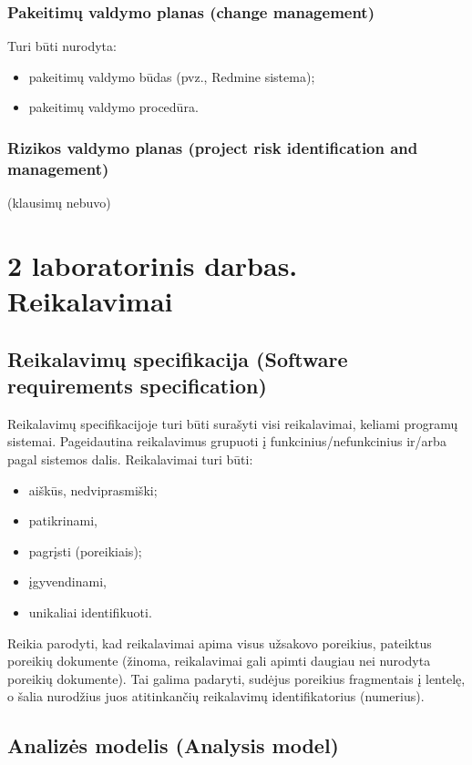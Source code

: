 \documentclass[12pt,a4paper]{article}
\begin{document}
\subsubsection*{Pakeitimų valdymo planas (change management)}

Turi būti nurodyta:
\begin{itemize}
    \item pakeitimų valdymo būdas (pvz., Redmine sistema);
    \item pakeitimų valdymo procedūra.
\end{itemize}

\subsubsection*{Rizikos valdymo planas (project risk identification and management)}

(klausimų nebuvo)

\section*{2 laboratorinis darbas. Reikalavimai}

\subsection*{Reikalavimų specifikacija (Software requirements specification)}

Reikalavimų specifikacijoje turi būti surašyti visi reikalavimai, keliami programų sistemai. Pageidautina reikalavimus grupuoti į funkcinius/nefunkcinius ir/arba pagal sistemos dalis. Reikalavimai turi būti:
\begin{itemize}
    \item aiškūs, nedviprasmiški;
    \item patikrinami,
    \item pagrįsti (poreikiais);
    \item įgyvendinami,
    \item unikaliai identifikuoti.
\end{itemize}

Reikia parodyti, kad reikalavimai apima visus užsakovo poreikius, pateiktus poreikių dokumente (žinoma, reikalavimai gali apimti daugiau nei nurodyta poreikių dokumente). Tai galima padaryti, sudėjus poreikius fragmentais į lentelę, o šalia nurodžius juos atitinkančių reikalavimų identifikatorius (numerius).

\subsection*{Analizės modelis (Analysis model)}
\end{document}
